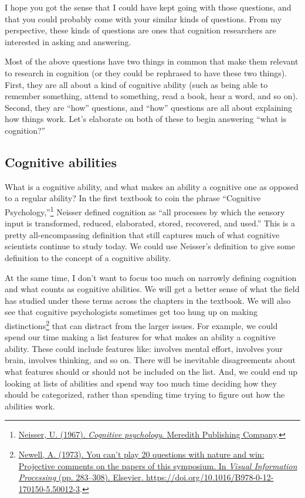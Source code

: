 \documentclass[
  oneside,
  12pt]{crumpbook}
\begin{document}
I hope you got the sense that I could have kept going with those questions, and that you could probably come with your similar kinds of questions. From my perspective, these kinds of questions are ones that cognition researchers are interested in asking and answering.

Most of the above questions have two things in common that make them relevant to research in cognition (or they could be rephrased to have these two things). First, they are all about a kind of cognitive ability (such as being able to remember something, attend to something, read a book, hear a word, and so on). Second, they are ``how'' questions, and ``how'' questions are all about explaining how things work. Let's elaborate on both of these to begin answering ``what is cognition?''

\hypertarget{cognitive-abilities}{%
\subsection{Cognitive abilities}\label{cognitive-abilities}}

What is a cognitive ability, and what makes an ability a cognitive one as opposed to a regular ability? In the first textbook to coin the phrase ``Cognitive Psychology,''\footnote{\protect\hyperlink{ref-neisserCognitivePsychology1967}{Neisser, U. (1967). \emph{Cognitive psychology}. {Meredith Publishing Company}}.} Neisser defined cognition as ``all processes by which the sensory input is transformed, reduced, elaborated, stored, recovered, and used.'' This is a pretty all-encompassing definition that still captures much of what cognitive scientists continue to study today. We could use Neisser's definition to give some definition to the concept of a cognitive ability.

At the same time, I don't want to focus too much on narrowly defining cognition and what counts as cognitive abilities. We will get a better sense of what the field has studied under these terms across the chapters in the textbook. We will also see that cognitive psychologists sometimes get too hung up on making distinctions\footnote{\protect\hyperlink{ref-newellYouCanPlay1973}{Newell, A. (1973). You can't play 20 questions with nature and win: {Projective} comments on the papers of this symposium. In \emph{Visual {Information Processing}} (pp. 283--308). {Elsevier}. \url{https://doi.org/10.1016/B978-0-12-170150-5.50012-3}}.} that can distract from the larger issues. For example, we could spend our time making a list features for what makes an ability a cognitive ability. These could include features like: involves mental effort, involves your brain, involves thinking, and so on. There will be inevitable disagreements about what features should or should not be included on the list. And, we could end up looking at lists of abilities and spend way too much time deciding how they should be categorized, rather than spending time trying to figure out how the abilities work.
\end{document}
